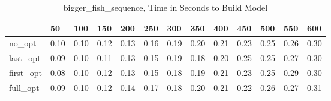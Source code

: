 \begin{table}
\caption{bigger\_fish\_sequence, Time in Seconds to Build Model}
\label{bigger_fish_sequence_model_time}
\begin{tabular}{lllllllllllll}
\toprule
 & 50 & 100 & 150 & 200 & 250 & 300 & 350 & 400 & 450 & 500 & 550 & 600 \\
\midrule
no\_opt & 0.10 & 0.10 & 0.12 & 0.13 & 0.16 & 0.19 & 0.20 & 0.21 & 0.23 & 0.25 & 0.26 & 0.30 \\
last\_opt & 0.09 & 0.10 & 0.11 & 0.13 & 0.15 & 0.19 & 0.18 & 0.20 & 0.25 & 0.25 & 0.27 & 0.30 \\
first\_opt & 0.08 & 0.10 & 0.12 & 0.13 & 0.15 & 0.18 & 0.19 & 0.21 & 0.23 & 0.25 & 0.29 & 0.30 \\
full\_opt & 0.09 & 0.10 & 0.12 & 0.14 & 0.17 & 0.18 & 0.20 & 0.21 & 0.22 & 0.26 & 0.27 & 0.31 \\
\bottomrule
\end{tabular}
\end{table}
